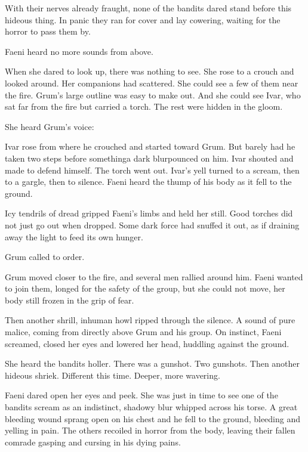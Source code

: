 With their nerves already fraught, none of the bandits dared stand before this hideous thing. 
In panic they ran for cover and lay cowering, waiting for the horror to pass them by. 

Faeni heard no more sounds from above. 

When she dared to look up, there was nothing to see. 
She rose to a crouch and looked around. 
Her companions had scattered. 
She could see a few of them near the fire.
Grum's large outline was easy to make out.
And she could see Ivar, who sat far from the fire but carried a torch. 
The rest were hidden in the gloom. 

She heard Grum's voice: 

Ivar rose from where he crouched and started toward Grum. 
But barely had he taken two steps before something\dash a dark blur\dash pounced on him. 
Ivar shouted and made to defend himself.
The torch went out. 
Ivar's yell turned to a scream, then to a gargle, then to silence. 
Faeni heard the thump of his body as it fell to the ground. 

Icy tendrils of dread gripped Faeni's limbs and held her still. 
Good torches did not just go out when dropped. 
Some dark force had snuffed it out, as if draining away the light to feed its own hunger.


Grum called to order. 

Grum moved closer to the fire, and several men rallied around him. 
Faeni wanted to join them, longed for the safety of the group, but she could not move, her body still frozen in the grip of fear. 

Then another shrill, inhuman howl ripped through the silence. 
A sound of pure malice, coming from directly above Grum and his group. 
On instinct, Faeni screamed, closed her eyes and lowered her head, huddling against the ground. 

She heard the bandits holler. 
There was a gunshot. 
Two gunshots. 
Then another hideous shriek. 
Different this time. 
Deeper, more wavering. 


Faeni dared open her eyes and peek. 
She was just in time to see one of the bandits scream as an indistinct, shadowy blur whipped across his torse. 
A great bleeding wound sprang open on his chest and he fell to the ground, bleeding and yelling in pain. 
The others recoiled in horror from the body, leaving their fallen comrade gasping and cursing in his dying pains. 


